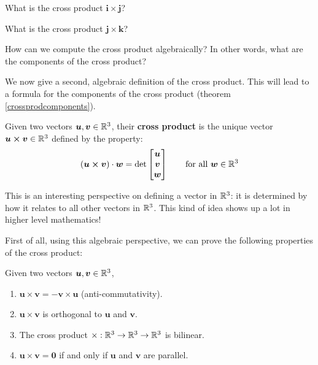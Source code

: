 \begin{example}
    What is the cross product $\bm{i} \times \bm{j}$?
\end{example}

\begin{example}
    What is the cross product $\bm{j} \times \bm{k}$?
\end{example}

\begin{motivating}
How can we compute the cross product algebraically?  In other words, what are the components of the cross product?
\end{motivating}

We now give a second, algebraic definition of the cross product.  This will lead to a formula for the components of the cross product (theorem \ref{crossprodcomponents}).


\begin{definition}\label{crossproddet}
    Given two vectors $\bm{u}, \bm{v} \in \mathbb{R}^3$, their \textbf{cross product} is the \textnormal{unique} vector $\bm{u \times v} \in \mathbb{R}^3$ defined by the property:
    \begin{equation*}
(\bm{u \times v}) \cdot \bm{w} = \textnormal{det}
\begin{bmatrix}
\bm{u}\\
    \bm{v}  \\
    \bm{w}
\end{bmatrix} \qquad \textnormal{for all } \bm{w} \in \mathbb{R}^3
\end{equation*}
    
    \end{definition}

This is an interesting perspective on defining a vector in $\mathbb{R}^3$: it is determined by how it relates to all other vectors in $\mathbb{R}^3$.  This kind of idea shows up a lot in higher level mathematics!

First of all, using this algebraic perspective, we can prove the following properties of the cross product: 

\begin{theorem}
    
    Given two vectors $\bm{u}, \bm{v} \in \mathbb{R}^3$,
    
    \begin{enumerate}
        \item $\bm{u} \times \bm{v} = - \bm{v} \times \bm{u}$ (anti-commutativity).
        \item $\bm{u} \times \bm{v}$ is orthogonal to $\bm{u}$ and $\bm{v}$.
        \item The cross product $\times : \mathbb{R}^3 \to \mathbb{R}^3 \to \mathbb{R}^3$ is bilinear.
        \item $\bm{u} \times \bm{v} = \bm{0}$ if and only if $\bm{u}$ and $\bm{v}$ are parallel.
    \end{enumerate}
    
    \end{theorem}


